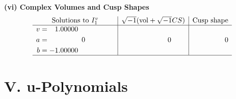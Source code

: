 \documentclass[1p]{elsarticle_modified}
\theoremstyle{definition}
\newcommand{\I}{\sqrt{-1}}
\begin{document}
\newpage\flushleft \textbf{(vi) Complex Volumes and Cusp Shapes}
$$\begin{array}{c|c|c}  
\text{Solutions to }I^v_{1}& \I (\text{vol} + \sqrt{-1}CS) & \text{Cusp shape}\\
 \hline 
\begin{aligned}
v &= \phantom{-}1.00000\phantom{ +0.000000I} \\
a &= \phantom{-0.000000 } 0 \\
b &= -1.00000\phantom{ +0.000000I}\end{aligned}
 & \phantom{-0.000000 } 0 & \phantom{-0.000000 } 0\\
 \hline 
 \end{array}$$\newpage
\newpage\renewcommand{\arraystretch}{1}
\centering \section*{ V. u-Polynomials}
\end{document}
